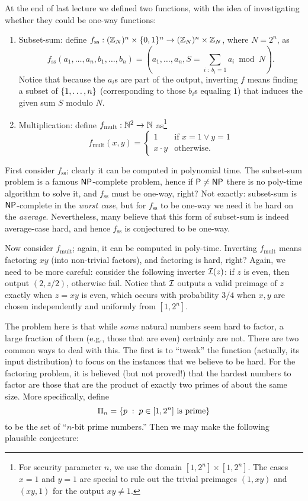 \documentclass[11pt]{article}
\begin{document}
At the end of last lecture we defined two functions, with the idea of
investigating whether they could be one-way functions:
\begin{enumerate}
\item Subset-sum: define $f_{\text{ss}} : (\mathbb{Z}_{N})^{n} \times \{0,1\}^{n}
  \to (\mathbb{Z}_{N})^{n} \times \mathbb{Z}_{N}$, where $N = 2^{n}$, as \[
  f_{\text{ss}}(a_{1}, \ldots, a_{n}, b_{1}, \ldots, b_{n}) = (a_{1},
  \ldots, a_{n}, S = \sum_{i\; :\; b_{i} = 1} a_{i} \bmod N). \]
  Notice that because the $a_{i}$s are part of the output, inverting
  $f$ means finding a subset of $\{1,\ldots,n\}$ (corresponding to
  those $b_{i}$s equaling $1$) that induces the given sum $S$ modulo
  $N$.
\item Multiplication: define $f_{\text{mult}} : \mathbb{N}^{2} \to \mathbb{N}$
  as\footnote{For security parameter $n$, we use the domain $[1,2^{n}]
    \times [1,2^{n}]$.  The cases $x=1$ and $y=1$ are special to rule
    out the trivial preimages $(1,xy)$ and $(xy, 1)$ for the output
    $xy \neq 1$.}
  \[
  f_{\text{mult}}(x,y) =
  \begin{cases}
    1 & \text{if } x=1 \vee y=1 \\
    x \cdot y & \text{otherwise.}
  \end{cases}
  \]
\end{enumerate}

First consider $f_{\text{ss}}$; clearly it can be computed in
polynomial time.  The subset-sum problem is a famous $\mathsf{NP}$-complete
problem, hence if $\mathsf{P} \neq \mathsf{NP}$ there is no poly-time algorithm to
solve it, and $f_{\text{ss}}$ must be one-way, right?  Not exactly:
subset-sum is $\mathsf{NP}$-complete in the \emph{worst case}, but for
$f_{\text{ss}}$ to be one-way we need it be hard on the
\emph{average}.  Nevertheless, many believe that this form of
subset-sum is indeed average-case hard, and hence $f_{\text{ss}}$ is
conjectured to be one-way.

Now consider $f_{\text{mult}}$; again, it can be computed in
poly-time.  Inverting $f_{\text{mult}}$ means factoring $xy$ (into
non-trivial factors), and factoring is hard, right?  Again, we need to
be more careful: consider the following inverter $\mathcal{I}(z)$: if $z$ is
even, then output $(2, z/2)$, otherwise fail.  Notice that $\mathcal{I}$
outputs a valid preimage of $z$ exactly when $z = xy$ is even, which
occurs with probability $3/4$ when $x, y$ are chosen independently and
uniformly from $[1,2^{n}]$.

The problem here is that while \emph{some} natural numbers seem hard
to factor, a large fraction of them (e.g., those that are even)
certainly are not.  There are two common ways to deal with this.  The
first is to ``tweak'' the function (actually, its input distribution)
to focus on the instances that we believe to be hard.  For the
factoring problem, it is believed (but not proved!) that the hardest
numbers to factor are those that are the product of exactly two primes
of about the same size.  More specifically, define \[ \Pi_{n} = \{
  p\; :\; p \in [1,2^{n}] \text{ is prime}\} \] to be the set of
``$n$-bit prime numbers.''  Then we may make the following plausible
conjecture:
\end{document}
